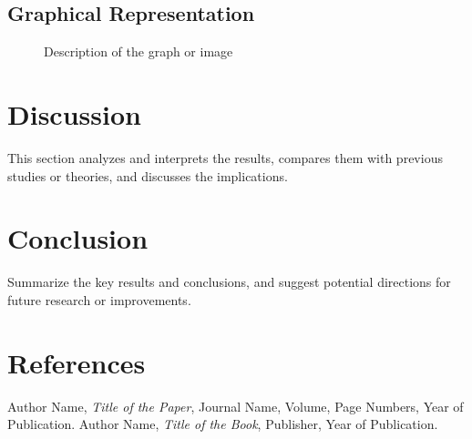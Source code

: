 \documentclass[a4paper,12pt]{article}
\begin{document}
\subsection{Graphical Representation}
\begin{figure}[h!]
    \centering
    \caption{Description of the graph or image}
    \label{fig:my_label}
\end{figure}

\section{Discussion}
This section analyzes and interprets the results, compares them with previous studies or theories, and discusses the implications.

\section{Conclusion}
Summarize the key results and conclusions, and suggest potential directions for future research or improvements.

\section{References}
\begin{thebibliography}{99}
 Author Name, \textit{Title of the Paper}, Journal Name, Volume, Page Numbers, Year of Publication.
 Author Name, \textit{Title of the Book}, Publisher, Year of Publication.
\end{thebibliography}
\end{document}

